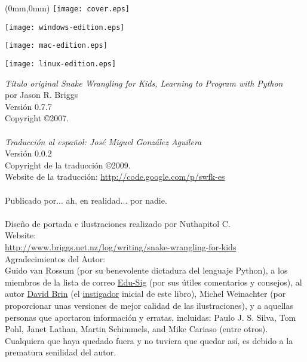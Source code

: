 \pagestyle{empty}
\frontmatter
\begin{FRONTCOVER}
\begin{titlepage}
\begin{textblock*}{210mm}(0mm,0mm)
   \texttt{[image: cover.eps]}
\end{textblock*}
\begin{flushleft}
\begin{WINDOWS}
\texttt{[image: windows-edition.eps]} 
\end{WINDOWS}
\begin{MAC}
\texttt{[image: mac-edition.eps]} 
\end{MAC}
\begin{LINUX}
\texttt{[image: linux-edition.eps]} 
\end{LINUX}
\end{flushleft}
\end{titlepage}
\end{FRONTCOVER}

\noindent
\textsf{\emph{Título original Snake Wrangling for Kids, Learning to Program with Python}}\\
por Jason R. Briggs\\
Versión 0.7.7
\\
Copyright \copyright 2007.\\
\\
\textsf{\emph{Traducción al español: José Miguel González Aguilera}}\\
Versión 0.0.2
\\
Copyright de la traducción \copyright 2009.\\
Website de la traducción: \href{http://code.google.com/p/swfk-es}{http://code.google.com/p/swfk-es}\\
\\
Publicado por... ah, en realidad... por nadie.\\
\\
Diseño de portada e ilustraciones realizado por Nuthapitol C.\\
\linebreak 
\noindent
Website:\\ \href{http://www.briggs.net.nz/log/writing/snake-wrangling-for-kids}{http://www.briggs.net.nz/log/writing/snake-wrangling-for-kids}\\ 

\noindent
Agradecimientos del Autor:\\
Guido van Rossum (por su benevolente dictadura del lenguaje Python), a los miembros de la lista de correo \href{http://www.python.org/community/sigs/current/edu-sig/}{Edu-Sig} (por sus útiles comentarios y consejos), al autor \href{http://www.davidbrin.com/}{David Brin} (el \href{http://www.salon.com/tech/feature/2006/09/14/basic/}{instigador} inicial de este libro), Michel Weinachter (por proporcionar unas versiones de mejor calidad de las ilustraciones), y a aquellas personas que aportaron información y erratas, incluidas: Paulo J. S. Silva, Tom Pohl, Janet Lathan, Martin Schimmels, and Mike Cariaso (entre otros).  Cualquiera que haya quedado fuera y no tuviera que quedar así, es debido a la prematura senilidad del autor.\\

